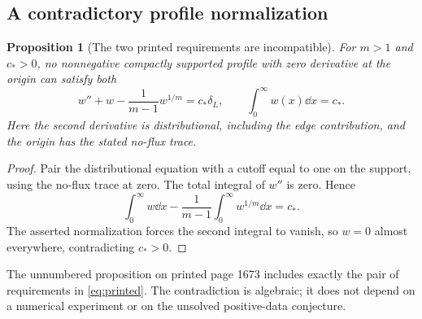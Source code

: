 \documentclass[11pt,a4paper]{article}
\newtheorem{proposition}[theorem]{Proposition}
\theoremstyle{remark}\newtheorem{remark}[theorem]{Remark}
\begin{document}
\subsection{A contradictory profile normalization}
\begin{proposition}[The two printed requirements are incompatible]\label{prop:contradiction}
For $m>1$ and $c_*>0$, no nonnegative compactly supported profile with zero derivative at the origin can satisfy both
\begin{equation}
 w''+w-\frac1{m-1}w^{1/m}=c_*\delta_L,
 \qquad\int_0^\infty w(x)\dd x=c_* .\label{eq:printed}
\end{equation}
Here the second derivative is distributional, including the edge contribution, and the origin has the stated no-flux trace.
\end{proposition}
\begin{proof}
Pair the distributional equation with a cutoff equal to one on the support, using the no-flux trace at zero. The total integral of $w''$ is zero. Hence
\[
 \int_0^\infty w\dd x-\frac1{m-1}\int_0^\infty w^{1/m}\dd x=c_*.
\]
The asserted normalization forces the second integral to vanish, so $w=0$ almost everywhere, contradicting $c_*>0$.
\end{proof}
The unnumbered proposition on printed page 1673 includes exactly the pair of requirements in \eqref{eq:printed}. The contradiction is algebraic; it does not depend on a numerical experiment or on the unsolved positive-data conjecture.
\end{document}
